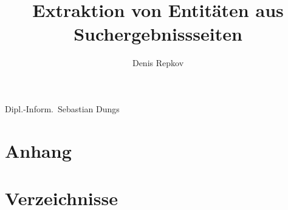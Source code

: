\documentclass[
11pt,
titlepage,
a4paper,
abstracton,
twoside,
openright,
chapterprefix,
noappendixprefix,
headsepline,
footsepline,
cleardoubleplain,
bibtotoc,
liststotoc,
pointlessnumbers
]{scrreprt}
\begin{document}
\title{Extraktion von Entitäten aus Suchergebnissseiten}
\author{Denis Repkov}
{Dipl.-Inform.~Sebastian Dungs}

\maketitle

\setcounter{page}{2}
\begin{abstract}
\thispagestyle{plain}

\end{abstract}

\pagestyle{scrheadings}
\setcounter{tocdepth}{2}
\tableofcontents

\cleardoublepage
{}
\pagestyle{scrheadings}
\sloppy


%
%




\cleardoublepage
{}
\part*{Anhang}
\begin{appendix}

\end{appendix}

\cleardoublepage
\part*{Verzeichnisse}
\listoffigures
\listoftables
\lstlistoflistings



\cleardoublepage
\pagestyle{empty}

\pagestyle{empty}
\cleardoubleemptypage
\end{document}
